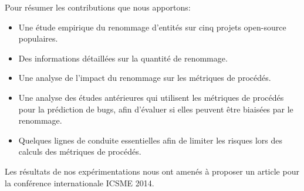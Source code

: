 Pour résumer les contributions que nous apportons:
\begin{itemize}
\item Une étude empirique du renommage d'entités sur cinq projets open-source populaires.    
\item Des informations détaillées sur la quantité de renommage.
\item Une analyse de l'impact du renommage sur les métriques de procédés.
\item Une analyse des études antérieures qui utilisent les métriques de procédés pour la prédiction de bugs, afin d'évaluer si elles peuvent être biaisées par le renommage. 
\item Quelques lignes de conduite essentielles afin de limiter les risques lors des calculs des métriques de procédés.\\
\end{itemize}


Les résultats de nos expérimentations nous ont amenés à proposer un article pour la conférence internationale ICSME 2014.

